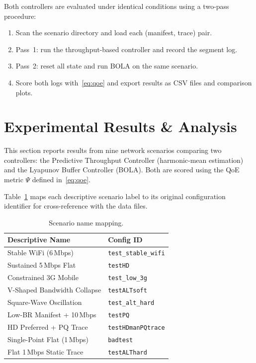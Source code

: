 \documentclass[conference]{IEEEtran}
\begin{document}
Both controllers are evaluated under identical conditions using a
two-pass procedure:
\begin{enumerate}
  \item Scan the scenario directory and load each (manifest, trace) pair.
  \item Pass~1: run the throughput-based controller and record the
    segment log.
  \item Pass~2: reset all state and run BOLA on the same scenario.
  \item Score both logs with~\eqref{eq:qoe} and export results as CSV
    files and comparison plots.
\end{enumerate}

\section{Experimental Results \& Analysis}
\label{sec:results}

This section reports results from nine network scenarios comparing two
controllers: the Predictive Throughput Controller (harmonic-mean
estimation) and the Lyapunov Buffer Controller (BOLA).  Both are scored
using the QoE metric $\Psi$ defined in~\eqref{eq:qoe}.

Table~\ref{tab:scenario-names} maps each descriptive scenario label to its
original configuration identifier for cross-reference with the data files.

\begin{table}[htbp]
\caption{Scenario name mapping.}
\label{tab:scenario-names}
\centering
\renewcommand{\arraystretch}{1.1}
\scriptsize
\begin{tabular}{@{} p{3.2cm} l @{}}
\hline
\textbf{Descriptive Name} & \textbf{Config ID} \\
\hline
Stable WiFi (6\,Mbps)          & \texttt{test\_stable\_wifi}  \\
Sustained 5\,Mbps Flat         & \texttt{testHD}              \\
Constrained 3G Mobile          & \texttt{test\_low\_3g}       \\
V-Shaped Bandwidth Collapse    & \texttt{testALTsoft}         \\
Square-Wave Oscillation        & \texttt{test\_alt\_hard}     \\
Low-BR Manifest + 10\,Mbps    & \texttt{testPQ}              \\
HD Preferred + PQ Trace        & \texttt{testHDmanPQtrace}    \\
Single-Point Flat (1\,Mbps)   & \texttt{badtest}             \\
Flat 1\,Mbps Static Trace      & \texttt{testALThard}         \\
\hline
\end{tabular}
\end{table}
\end{document}
